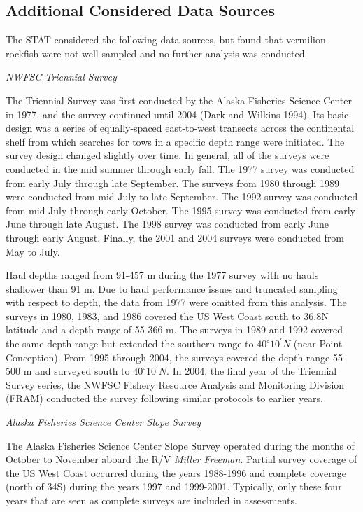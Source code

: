\documentclass[
  english,
  a4paper,
]{article}
\begin{document}
\hypertarget{additional-considered-data-sources}{%
\subsection{Additional Considered Data Sources}\label{additional-considered-data-sources}}

The STAT considered the following data sources, but found that vermilion rockfish were
not well sampled and no further analysis was conducted.

\emph{NWFSC Triennial Survey}

The Triennial Survey was first conducted by the Alaska Fisheries Science Center in 1977, and the survey
continued until 2004 (Dark and Wilkins 1994).
Its basic design was a series of equally-spaced east-to-west transects across
the continental shelf from which searches for tows in a specific depth range were initiated.
The survey design changed slightly over time.
In general, all of the surveys were conducted in the mid summer through early fall.
The 1977 survey was conducted from early July through late September.
The surveys from 1980 through 1989 were conducted from mid-July to late September.
The 1992 survey was conducted from mid July through early October.
The 1995 survey was conducted from early June through late August.
The 1998 survey was conducted from early June through early August.
Finally, the 2001 and 2004 surveys were conducted from May to July.

Haul depths ranged from 91-457 m during the 1977 survey with no hauls shallower
than 91 m.
Due to haul performance issues and truncated sampling with respect to depth, the
data from 1977 were omitted from this analysis.
The surveys in 1980, 1983, and 1986 covered the US West Coast south to
36.8\textdegree N latitude and a depth range of 55-366 m.
The surveys in 1989 and 1992 covered the same depth range but extended the
southern range to $40^\circ 10^\prime N$ (near Point Conception).
From 1995 through 2004, the surveys covered the depth range 55-500 m and
surveyed south to $40^\circ 10^\prime N$.
In 2004, the final year of the Triennial Survey series, the NWFSC Fishery
Resource Analysis and Monitoring Division (FRAM) conducted the survey following
similar protocols to earlier years.

\emph{Alaska Fisheries Science Center Slope Survey}

The Alaska Fisheries Science Center Slope Survey operated during the months of October to November aboard the
R/V \emph{Miller Freeman}.
Partial survey coverage of the US West Coast occurred during the years 1988-1996
and complete coverage (north of 34\textquotesingle S) during the
years 1997 and 1999-2001.
Typically, only these four years that are seen as complete surveys are included
in assessments.
\end{document}
